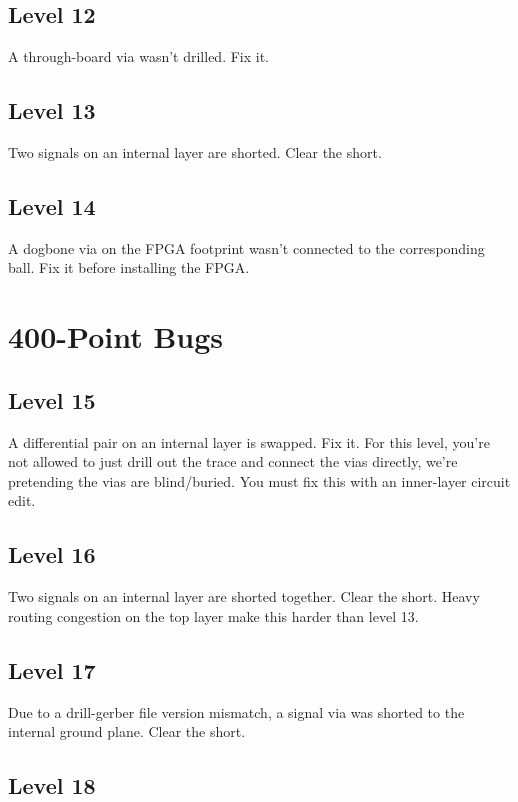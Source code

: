 \documentclass{article}
\begin{document}
\subsection{Level 12}

A through-board via wasn't drilled. Fix it.

\subsection{Level 13}

Two signals on an internal layer are shorted. Clear the short.

\subsection{Level 14}

A dogbone via on the FPGA footprint wasn't connected to the corresponding ball. Fix it before installing the FPGA.

\pagebreak
\section{400-Point Bugs}

\subsection{Level 15}

A differential pair on an internal layer is swapped. Fix it. For this level, you're not allowed to just drill out the
trace and connect the vias directly, we're pretending the vias are blind/buried. You must fix this with an inner-layer
circuit edit.

\subsection{Level 16}

Two signals on an internal layer are shorted together. Clear the short. Heavy routing congestion on the top layer
make this harder than level 13.

\subsection{Level 17}

Due to a drill-gerber file version mismatch, a signal via was shorted to the internal ground plane. Clear the short.

\subsection{Level 18}
\end{document}
